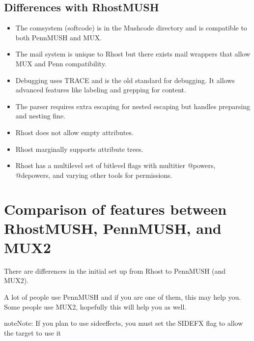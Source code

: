 \documentclass[letterpaper,10pt,english]{sphinxmanual}
\begin{document}
\subsection{Differences with RhostMUSH}
\label{\detokenize{differences:differences-with-rhostmush}}\begin{itemize}
\item {} 
\sphinxAtStartPar
The comsystem (softcode) is in the Mushcode directory and is compatible to both PennMUSH and MUX.

\item {} 
\sphinxAtStartPar
The mail system is unique to Rhost but there exists mail wrappers that allow MUX and Penn compatibility.

\item {} 
\sphinxAtStartPar
Debugging uses TRACE and is the old standard for debugging.  It allows advanced features like labeling and grepping for content.

\item {} 
\sphinxAtStartPar
The parser requires extra escaping for nested escaping but handles pre\sphinxhyphen{}parsing and nesting fine.

\item {} 
\sphinxAtStartPar
Rhost does not allow empty attributes.

\item {} 
\sphinxAtStartPar
Rhost marginally supports attribute trees.

\item {} 
\sphinxAtStartPar
Rhost has a multi\sphinxhyphen{}level set of bitlevel flags with multi\sphinxhyphen{}tier @powers, @depowers, and varying other tools for permissions.

\end{itemize}


\section{Comparison of features between RhostMUSH, PennMUSH, and MUX2}
\label{\detokenize{differences:comparison-of-features-between-rhostmush-pennmush-and-mux2}}
\sphinxAtStartPar
There are differences in the initial set up from Rhost to PennMUSH (and MUX2).

\sphinxAtStartPar
A lot of people use PennMUSH and if you are one of them, this may help you.
Some people use MUX2, hopefully this will help you as well.

\begin{sphinxadmonition}{note}{Note:}
\sphinxAtStartPar
If you plan to use sideeffects, you must set the SIDEFX flag to allow
the target to use it
\end{sphinxadmonition}
\end{document}
